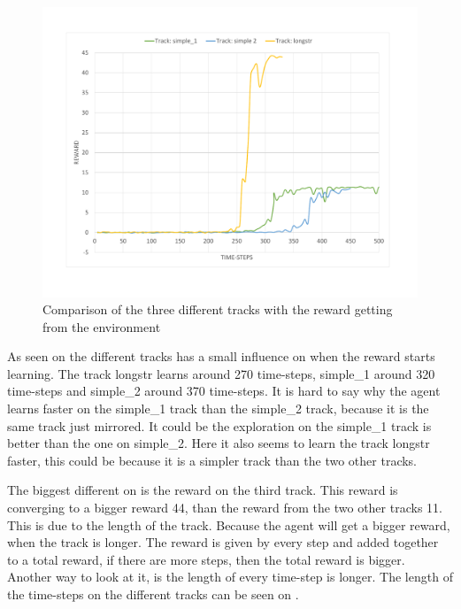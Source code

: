 \begin{figure}[H]
	\centering
	\includegraphics[width=1\textwidth]{Figures/Result/change_of_track_reward_graph.pdf}
	\caption{Comparison of the three different tracks with the reward getting from the environment}
	\label{fig:change_of_track_reward_graph}
\end{figure}

As seen on  the different tracks has a small influence on when the reward starts learning. The track longstr learns around 270 time-steps, simple\_1 around 320 time-steps and simple\_2 around 370 time-steps. It is hard to say why the agent learns faster on the simple\_1 track than the simple\_2 track, because it is the same track just mirrored. It could be the exploration on the simple\_1 track is better than the one on simple\_2. Here it also seems to learn the track longstr faster, this could be because it is a simpler track than the two other tracks.  

The biggest different on  is the reward on the third track. This reward is converging to a bigger reward 44, than the reward from the two other tracks 11. This is due to the length of the track. Because the agent will get a bigger reward, when the track is longer. The reward is given by every step and added together to a total reward, if there are more steps, then the total reward is bigger. Another way to look at it, is the length of every time-step is longer. The length of the time-steps on the different tracks can be seen on .      

